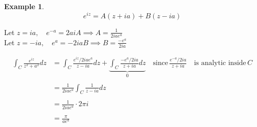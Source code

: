 \documentclass[11pt,a4paper]{article}
\theoremstyle{definition}
\newtheorem{example}[thm]{Example}
\begin{document}
\begin{example}
$$e^{iz} = A(z + ia) + B(z - ia)$$

Let $z = ia, \quad  e^{-a} = 2aiA \implies A= \frac{1}{2iae^a}$\\

Let $z = - ia, \quad  e^a = -2iaB \implies B = \frac{-e^a}{2ia}$




\begin{align*}
\int_C \frac{e^{iz}}{z^2 + a^2}dz  & = \int_C \frac{e^{iz}/2iae^a}{z - ia}dz + \underbrace{\int_C \frac{-e^{a}/2ia}{z + ia}dz}_0\quad \text{since}\,\frac{e^{-a}/2ia}{z + ia}\quad  \text{is analytic inside}\,C\\\\
& = \frac{1}{2iae^a}\int_C \frac{1}{z - ia}dz\\\\
& = \frac{1}{2iae^a}\cdot 2\pi i\\\\
& = \frac{\pi}{ae^a}\\\\
\end{align*}
\end{example}
\end{document}
